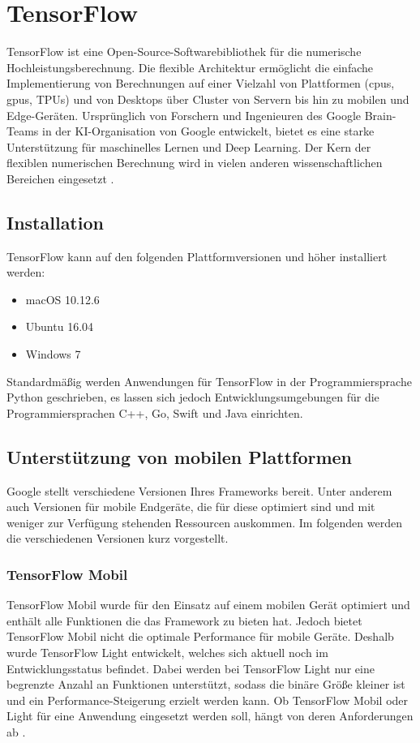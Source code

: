 \section{TensorFlow}\label{sec:tensorflow}
TensorFlow ist eine Open-Source-Softwarebibliothek für die numerische Hochleistungsberechnung. Die flexible Architektur ermöglicht die einfache Implementierung von Berechnungen auf einer Vielzahl von Plattformen (\ac{cpu}s, \ac{gpu}s, TPUs) und von Desktops über Cluster von Servern bis hin zu mobilen und Edge-Geräten. Ursprünglich von Forschern und Ingenieuren des Google Brain-Teams in der KI-Organisation von Google entwickelt, bietet es eine starke Unterstützung für maschinelles Lernen und Deep Learning. Der Kern der flexiblen numerischen Berechnung wird in vielen anderen wissenschaftlichen Bereichen eingesetzt \cite{tensorflow}.

\subsection{Installation}
TensorFlow kann auf den folgenden Plattformversionen und höher installiert werden: 
\begin{itemize}
	\item macOS 10.12.6 
	\item Ubuntu 16.04 
	\item Windows 7 
\end{itemize}

Standardmäßig werden Anwendungen für TensorFlow in der Programmiersprache Python geschrieben, es lassen sich jedoch Entwicklungsumgebungen für die Programmiersprachen C++, Go, Swift und Java einrichten.

\subsection{Unterstützung von mobilen Plattformen}
Google stellt verschiedene Versionen Ihres Frameworks bereit. Unter anderem auch Versionen für mobile Endgeräte, die für diese optimiert sind und mit weniger zur Verfügung stehenden Ressourcen auskommen. Im folgenden werden die verschiedenen Versionen kurz vorgestellt.

\subsubsection{TensorFlow Mobil}
TensorFlow Mobil wurde für den Einsatz auf einem mobilen Gerät optimiert und enthält alle Funktionen die das Framework zu bieten hat. Jedoch bietet TensorFlow Mobil nicht die optimale Performance für mobile Geräte. Deshalb wurde TensorFlow Light entwickelt, welches sich aktuell noch im Entwicklungsstatus befindet. Dabei werden bei TensorFlow Light nur eine begrenzte Anzahl an Funktionen unterstützt, sodass die binäre Größe kleiner ist und ein Performance-Steigerung erzielt werden kann. Ob TensorFlow Mobil oder Light für eine Anwendung eingesetzt werden soll, hängt von deren Anforderungen ab \cite{tensorflow}. 

